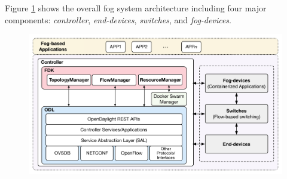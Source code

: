 Figure \ref{controller} shows the overall fog system architecture including four major components: \textit{controller}, \textit{end-devices}, \textit{switches}, and \textit{fog-devices}.
%
%
%
\begin{figure}[t]
\centering
\includegraphics[width=0.8\linewidth]{overall_arch.pdf}
  \label{controller}
\end{figure}
%
%
%





